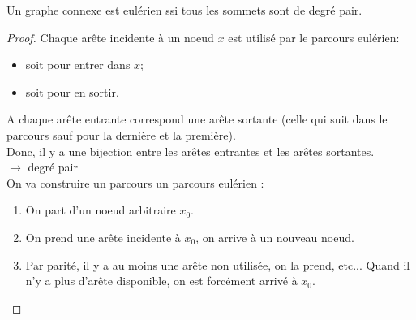 \begin{mytheo} 
  Un graphe connexe est eulérien ssi tous les sommets sont de degré pair.
  \begin{proof}
    \noindent
    \newline
    \fbox{$\Longrightarrow$}
    \newline
    Chaque arête incidente à un noeud $x$ est utilisé par le parcours eulérien:
    \begin{itemize}
      \item soit pour entrer dans $x$;
      \item soit pour en sortir.\\
    \end{itemize}
    A chaque arête entrante correspond une arête sortante (celle qui suit dans le parcours sauf pour la dernière et la première).\\
    Donc, il y a une bijection entre les arêtes entrantes et les arêtes sortantes.\\
    $\longrightarrow$ degré pair \\

    \noindent
    \fbox{$\Longleftarrow$}
    \newline
    On va construire un parcours un parcours eulérien :\\
    \begin{enumerate}
      \item On part d'un noeud arbitraire $x_0$.
      \item On prend une arête incidente à $x_0$, on arrive à un nouveau noeud.
      \item Par parité, il y a au moins une arête non utilisée, on la prend, etc... Quand il n'y a plus d'arête disponible, on est forcément arrivé à $x_0$.\\
    \end{enumerate}
    \begin{center}
\end{center}
\end{proof}
\end{mytheo}
